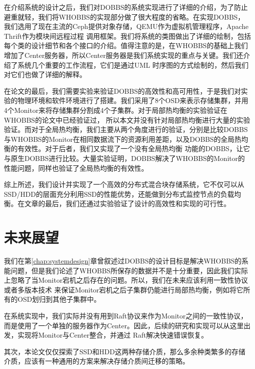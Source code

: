 在介绍系统的设计之后，我们对DOBBS的系统实现进行了详细的介绍，为了防止避重就轻，我们将WHOBBS的实现部分做了很大程度的省略。在实现DOBBS，我们选用了现在主流的Ceph提供对象存储，QEMU作为虚拟机管理程序，Apache Thrift作为模块间远程过程
调用框架。我们将系统的类图做出了详细的绘制，包括每个类的设计细节和各个接口的介绍。值得注意的是，在WHOBBS的基础上我们增加了Center服务器，所以Center服务器是我们系统实现的重点与关键。我们还介绍了系统几个重要的工作流程，它们是通过UML
时序图的方式绘制的，然后我们对它们也做了详细的解释。

在论文的最后，我们需要实验来验证DOBBS的高效性和高可用性，于是我们对实验的物理环境和软件环境进行了搭建。我们采用了8个OSD来表示存储集群，并用4个Monitor来将存储集群分割成4个子集群。对于局部热均衡的实验验证在WHOBBS的论文中已经验证过，
所以本文并没有针对局部热均衡进行大量的实验验证。而对于全局热均衡，我们主要从两个角度进行的验证，分别是比较DOBBS与WHOBBS的Monitor在相同数据流下的资源利用差距，以及DOBBS的全局热均衡的有效性。对于后者，我们又实现了一个没有全局热均衡
功能的DOBBS，让它与原生DOBBS进行比较。大量实验证明，DOBBS解决了WHOBBS的Monitor的性能问题，同样也验证了全局热均衡的有效性。

综上所述，我们设计并实现了一个高效的分布式混合块存储系统，它不仅可以从SSD/HDD的层面充分利用SSD的性能优势，还能做到分布式监控节点的负载均衡。在文章的最后，我们还通过实验验证了设计的高效性和实现的可行性。

\section{未来展望}
我们在第\ref{chap:systemdesign}章曾叙述过DOBBS的设计目标是解决WHOBBS的系能问题，但是我们论述了WHOBBS所保存的数据并不是十分重要，因此我们实际上忽略了当Monitor宕机之后存在的问题。所以，我们在未来应该利用一致性协议或者多版本技术
来保证Monitor宕机之后子集群仍能进行局部热均衡，例如将它所有的OSD划归到其他子集群中。

在系统实现中，我们实际并没有用到Raft协议来作为Monitor之间的一致性协议，而是使用了一个单独的服务器作为Center。因此，后续的研究和实现可以从这里出发，实现将Monitor与Center整合，并通过
Raft解决快速错误恢复。

其次，本论文仅仅探索了SSD和HDD这两种存储介质，那么多余种类繁多的存储介质，应该有一种通用的方案来解决存储介质间迁移的策略。

